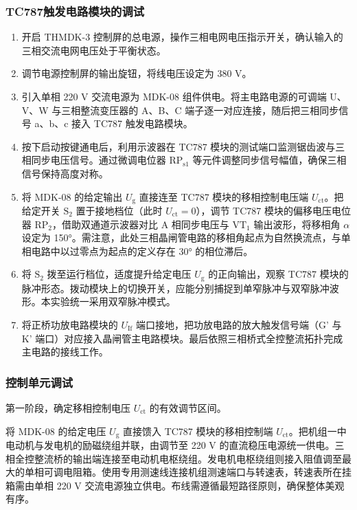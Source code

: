 \begin{framed}
{			\subsubsection{TC787触发电路模块的调试}
			\begin{enumerate}
				\item 开启 THMDK-3 控制屏的总电源，操作三相电网电压指示开关，确认输入的三相交流电网电压处于平衡状态。
				\item 调节电源控制屏的输出旋钮，将线电压设定为 380 V。
				\item 引入单相 220 V 交流电源为 MDK-08 组件供电。将主电路电源的可调端 U、V、W 与三相整流变压器的 A、B、C 端子逐一对应连接，随后把三相同步信号 a、b、c 接入 TC787 触发电路模块。
				\item 按下启动按键通电后，利用示波器在 TC787 模块的测试端口监测锯齿波与三相同步电压信号。通过微调电位器 $\text{RP}_{\text{s1}}$ 等元件调整同步信号幅值，确保三相信号保持高度对称。
				\item 将 MDK-08 的给定输出 $U_{\text{g}}$ 直接连至 TC787 模块的移相控制电压端 $U_{\text{ct}}$。把给定开关 $\text{S}_2$ 置于接地档位（此时 $U_{\text{ct}}=0$），调节 TC787 模块的偏移电压电位器 $\text{RP}_2$，借助双通道示波器对比 A 相同步电压与 $\text{VT}_1$ 输出波形，将移相角 $\alpha$ 设定为 150°。需注意，此处三相晶闸管电路的移相角起点为自然换流点，与单相电路中以过零点为起点的定义存在 30° 的相位滞后。
				\item 将 $\text{S}_2$ 拨至运行档位，适度提升给定电压 $U_{\text{g}}$ 的正向输出，观察 TC787 模块的脉冲形态。拨动模块上的切换开关，应能分别捕捉到单窄脉冲与双窄脉冲波形。本实验统一采用双窄脉冲模式。
				\item 将正桥功放电路模块的 $U_{\text{If}}$ 端口接地，把功放电路的放大触发信号端（G' 与 K' 端口）对应接入晶闸管主电路模块。最后依照三相桥式全控整流拓扑完成主电路的接线工作。
			\end{enumerate}
			
			\subsubsection{控制单元调试}
			第一阶段，确定移相控制电压 $U_{\text{ct}}$ 的有效调节区间。
			
			将 MDK-08 的给定电压 $U_{\text{g}}$ 直接馈入 TC787 模块的移相控制端 $U_{\text{ct}}$。把机组一中电动机与发电机的励磁绕组并联，由调节至 220 V 的直流稳压电源统一供电。三相全控整流桥的输出端连接至电动机电枢绕组。发电机电枢绕组则接入阻值调至最大的单相可调电阻箱。使用专用测速线连接机组测速端口与转速表，转速表所在挂箱需由单相 220 V 交流电源独立供电。布线需遵循最短路径原则，确保整体美观有序。
			
}
\end{framed}
